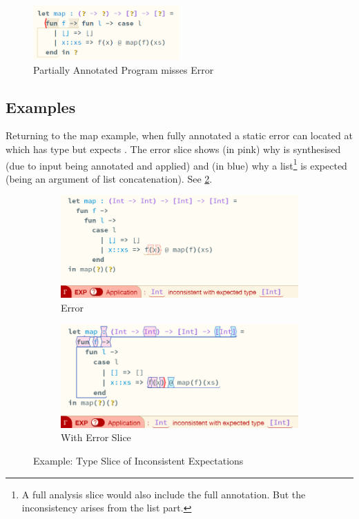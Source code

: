 \begin{figure}[H]
\centering
\includegraphics[width=0.5\textwidth]{Media/Figures/partial_annotations}
\caption{Partially Annotated Program misses Error}
\label{fig:HalfAnnotated}
\end{figure}

\subsection{Examples}
\label{sec:EvalExamples}
Returning to the map example, when fully annotated a static error can located at  which has type  but expects \code{[Int]}. The error slice shows (in pink) why  is synthesised (due to input  being annotated  and applied) and (in blue) why a list\footnote{A full analysis slice would also include the full \code{[Int]} annotation. But the inconsistency arises from the list part.} is expected (being an argument of list concatenation). See \cref{fig:MapExample}.
\begin{figure}[h]
\centering
\begin{subfigure}{0.49\textwidth}
\centering
\includegraphics[width=1\textwidth]{Media/Figures/map_example}
\caption{Error}
\end{subfigure}
\begin{subfigure}{0.49\textwidth}
\centering
\includegraphics[width=1\textwidth]{Media/Figures/map_example_sliced}
\caption{With Error Slice}
\end{subfigure}
\caption{Example: Type Slice of Inconsistent Expectations}
\label{fig:MapExample}
\end{figure}

